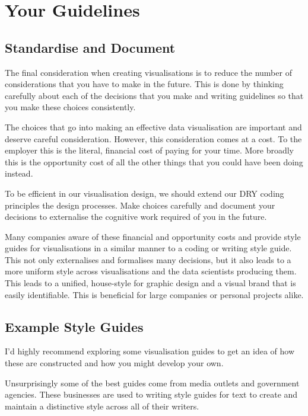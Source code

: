 \documentclass[
  letterpaper,
  DIV=11,
  numbers=noendperiod]{scrreprt}
\begin{document}
\section{Your Guidelines 📝}\label{your-guidelines}

\subsection{Standardise and Document}\label{standardise-and-document}

The final consideration when creating visualisations is to reduce the
number of considerations that you have to make in the future. This is
done by thinking carefully about each of the decisions that you make and
writing guidelines so that you make these choices consistently.

The choices that go into making an effective data visualisation are
important and deserve careful consideration. However, this consideration
comes at a cost. To the employer this is the literal, financial cost of
paying for your time. More broadly this is the opportunity cost of all
the other things that you could have been doing instead.

To be efficient in our visualisation design, we should extend our DRY
coding principles the design processes. Make choices carefully and
document your decisions to externalise the cognitive work required of
you in the future.

Many companies aware of these financial and opportunity costs and
provide style guides for visualisations in a similar manner to a coding
or writing style guide. This not only externalises and formalises many
decisions, but it also leads to a more uniform style across
visualisations and the data scientists producing them. This leads to a
unified, house-style for graphic design and a visual brand that is
easily identifiable. This is beneficial for large companies or personal
projects alike.

\subsection{Example Style Guides}\label{example-style-guides}

I'd highly recommend exploring some visualisation guides to get an idea
of how these are constructed and how you might develop your own.

Unsurprisingly some of the best guides come from media outlets and
government agencies. These businesses are used to writing style guides
for text to create and maintain a distinctive style across all of their
writers.
\end{document}
